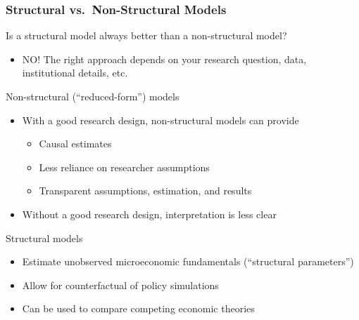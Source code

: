 \documentclass{beamer}\usepackage[]{graphicx}\usepackage[]{color}
\begin{document}
\begin{frame}\frametitle{Structural vs.\ Non-Structural Models}
    Is a structural model always better than a non-structural model?
    \begin{itemize}
        \item NO! The right approach depends on your research question, data, institutional details, etc.
    \end{itemize}
    \vspace{1.5ex}
    Non-structural (``reduced-form'') models
    \begin{itemize}
        \item With a good research design, non-structural models can provide
        \begin{itemize}
            \item Causal estimates
            \item Less reliance on researcher assumptions
            \item Transparent assumptions, estimation, and results
        \end{itemize}
        \item Without a good research design, interpretation is less clear
    \end{itemize}
    \vspace{1.5ex}
    Structural models
    \begin{itemize}
        \item Estimate unobserved microeconomic fundamentals (``structural parameters'')
        \item Allow for counterfactual of policy simulations
        \item Can be used to compare competing economic theories
    \end{itemize}
\end{frame}
\end{document}
